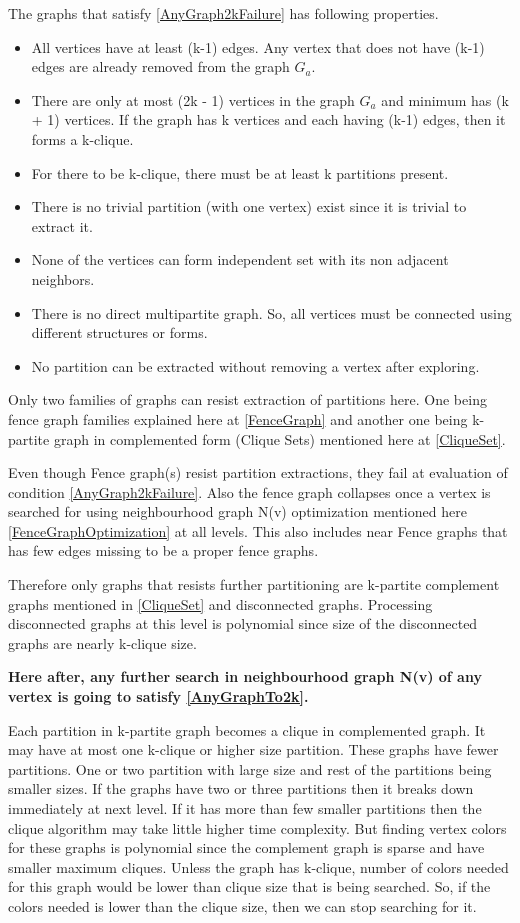 \documentclass[12pt]{article}
\theoremstyle{plain}
\theoremstyle{definition}
\begin{document}
The graphs that satisfy \ref{AnyGraph2kFailure} has following properties.
\begin{itemize}
	\setlength{\itemsep}{0pt}
	\setlength{\parskip}{0pt}
	\setlength{\parsep}{0pt}
	\item All vertices have at least (k-1) edges. Any vertex that does not have (k-1) edges are already removed from the graph $G_a$.
	\item There are only at most (2k - 1) vertices in the graph $G_a$ and minimum has (k + 1) vertices. If the graph has k vertices and each having (k-1) edges, then it forms a k-clique. 
	\item For there to be k-clique, there must be at least k partitions present.
	\item There is no trivial partition (with one vertex) exist since it is trivial to extract it.
	\item None of the vertices can form independent set with its non adjacent neighbors.
	\item There is no direct multipartite graph. So, all vertices must be connected using different structures or forms.
	\item No partition can be extracted without removing a vertex after exploring.
\end{itemize}

Only two families of graphs can resist extraction of partitions here. One being fence graph families explained here at \ref{FenceGraph} and another one being k-partite graph in complemented form (Clique Sets) mentioned here at \ref{CliqueSet}.

Even though Fence graph(s) resist partition extractions, they fail at evaluation of condition \ref{AnyGraph2kFailure}. Also the fence graph collapses once a vertex is searched for using neighbourhood graph N(v) optimization mentioned here \ref{FenceGraphOptimization} at all levels. This also includes near Fence graphs that has few edges missing to be a proper fence graphs.

Therefore only graphs that resists further partitioning are k-partite complement graphs mentioned in \ref*{CliqueSet} and disconnected graphs. Processing disconnected graphs at this level is polynomial since size of the disconnected graphs are nearly k-clique size.

\textbf{Here after, any further search in neighbourhood graph N(v) of any vertex is going to satisfy \ref{AnyGraphTo2k}.}


Each partition in k-partite graph becomes a clique in complemented graph. It may have at most one k-clique or higher size partition. These graphs have fewer partitions. One or two partition with large size and rest of the partitions being smaller sizes. If the graphs have two or three partitions then it breaks down immediately at next level. If it has more than few smaller partitions then the clique algorithm may take little higher time complexity. But finding vertex colors for these graphs is polynomial since the complement graph is sparse and have smaller maximum cliques. Unless the graph has k-clique, number of colors needed for this graph would be lower than clique size that is being searched. So, if the colors needed is lower than the clique size, then we can stop searching for it.
\end{document}
